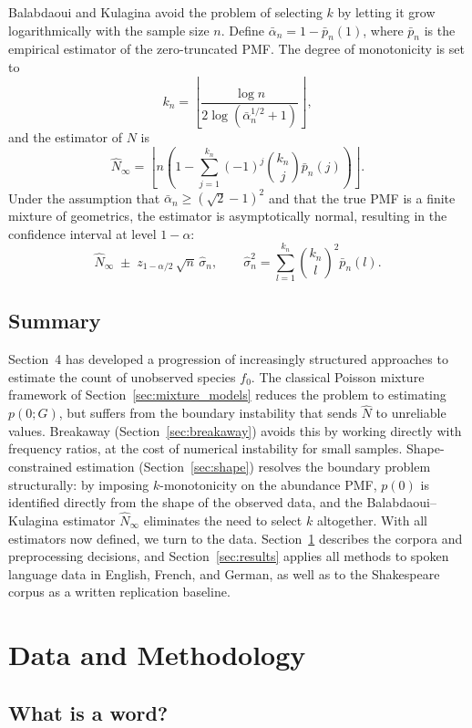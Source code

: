﻿\documentclass{article}
\begin{document}
Balabdaoui and Kulagina \cite{BalabdaouiKulagina2020} avoid the problem of selecting $k$ by letting it grow logarithmically with the sample size $n$. Define $\bar{\alpha}_n = 1 - \bar{p}_n(1)$, where $\bar{p}_n$ is the empirical estimator of the zero-truncated PMF. The degree of monotonicity is set to
\[
k_n = \left\lfloor \frac{\log n}{2 \log(\bar{\alpha}_n^{1/2} + 1)} 
\right\rfloor,
\]
and the estimator of $N$ is
\[
\hat{N}_{\infty} = \left\lfloor n\left(1 - \sum_{j=1}^{k_n} (-1)^j 
\binom{k_n}{j} \bar{p}_n(j)\right) \right\rfloor.
\]
Under the assumption that $\bar{\alpha}_n \geq (\sqrt{2} - 1)^2$ and that the true PMF is a finite mixture of geometrics, the estimator is asymptotically normal, resulting in the confidence interval at level $1 - \alpha$:
\[
\hat{N}_{\infty} \;\pm\; z_{1-\alpha/2}\,\sqrt{n}\,\hat{\sigma}_n, 
\qquad \hat{\sigma}_n^2 = \sum_{l=1}^{k_n} \binom{k_n}{l}^2 
\bar{p}_n(l).
\]

\subsection{Summary}
Section~4 has developed a progression of increasingly structured approaches to estimate the count of unobserved species $f_0$. The classical Poisson mixture framework of Section~\ref{sec:mixture_models} reduces the problem to estimating $p(0; G)$, but suffers from the boundary instability that sends $\hat{N}$ to unreliable values. Breakaway (Section~\ref{sec:breakaway}) avoids this by working directly with frequency ratios, at the cost of numerical instability for small samples. Shape-constrained estimation (Section~\ref{sec:shape}) resolves the boundary problem structurally: by imposing $k$-monotonicity on the abundance PMF, $p(0)$ is identified directly from the shape of the observed data, and the Balabdaoui--Kulagina estimator $\hat{N}_\infty$ eliminates the need to select $k$ altogether. With all estimators now defined, we turn to the data. Section~\ref{sec:data} describes the corpora and preprocessing decisions, and Section~\ref{sec:results} applies all methods to spoken language data in English, French, and German, as well as to the Shakespeare corpus as a written replication baseline.

\clearpage
\section{Data and Methodology}\label{sec:data}

\subsection{What is a word?}
\end{document}
